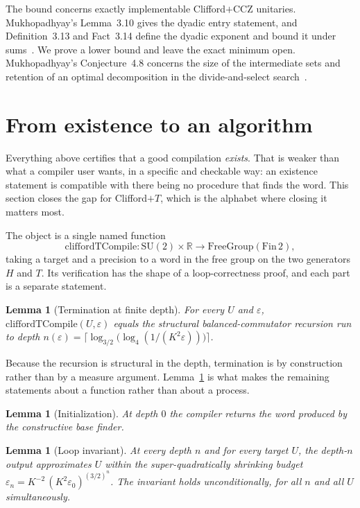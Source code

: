\documentclass[aps,pra,reprint,nofootinbib,superscriptaddress]{revtex4-2}
\newcommand{\su}[1]{\mathrm{SU}(#1)}
\theoremstyle{plain}
\newtheorem{lemma}[theorem]{Lemma}
\theoremstyle{definition}
\begin{document}
The bound concerns exactly implementable Clifford$+$CCZ unitaries.
Mukhopadhyay's Lemma~3.10 gives the dyadic entry statement, and
Definition~3.13 and Fact~3.14 define the dyadic exponent and bound it under
sums~\cite{Mukhopadhyay2024}. We prove a lower bound and leave the exact
minimum open. Mukhopadhyay's Conjecture~4.8 concerns the size of the
intermediate sets and retention of an optimal decomposition in the
divide-and-select search~\cite{Mukhopadhyay2024}.

\section{From existence to an algorithm}
\label{sec:compiler}

Everything above certifies that a good compilation \emph{exists}. That is
weaker than what a compiler user wants, in a specific and checkable way: an
existence statement is compatible with there being no procedure that finds the
word. This section closes the gap for Clifford$+T$, which is the alphabet where
closing it matters most.

The object is a single named function
\[
  \mathrm{cliffordTCompile} \colon \su 2 \times \mathbb R \longrightarrow
    \mathrm{FreeGroup}(\mathrm{Fin}\,2),
\]
taking a target and a precision to a word in the free group on the two
generators $H$ and $T$. Its verification has the shape of a loop-correctness
proof, and each part is a separate statement.

\begin{lemma}[Termination at finite depth]
\label{lem:compile-term}
For every $U$ and $\varepsilon$, $\mathrm{cliffordTCompile}(U,\varepsilon)$
equals the structural balanced-commutator recursion run to depth
$n(\varepsilon) = \lceil \log_{3/2}\big(\log_4 (1/(K^2\varepsilon))\big)\rceil$.
\end{lemma}

Because the recursion is structural in the depth, termination is by
construction rather than by a measure argument. Lemma~\ref{lem:compile-term} is
what makes the remaining statements about a function rather than about a
process.

\begin{lemma}[Initialization]
\label{lem:compile-base}
At depth $0$ the compiler returns the word produced by the constructive base
finder.
\end{lemma}

\begin{lemma}[Loop invariant]
\label{lem:compile-inv}
At every depth $n$ and for every target $U$, the depth-$n$ output approximates
$U$ within the super-quadratically shrinking budget
$\varepsilon_n = K^{-2}\,(K^2\varepsilon_0)^{(3/2)^n}$. The invariant holds
unconditionally, for all $n$ and all $U$ simultaneously.
\end{lemma}
\end{document}
